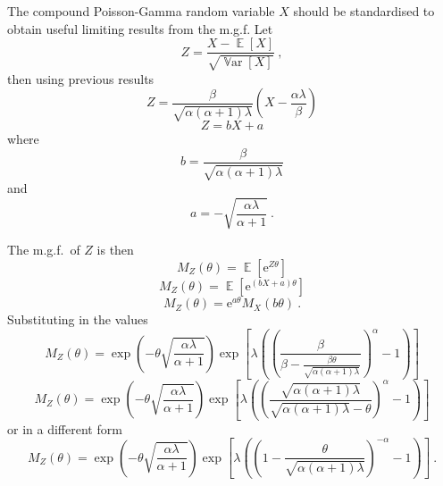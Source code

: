 \documentclass[12pt, a4paper]{memoir}
\DeclareMathOperator{\expectation}{\mathbb{E}}
\DeclareMathOperator{\variance}{\mathbb{V}ar}
\newcommand{\euler}{\mathrm{e}}
\begin{document}
The compound Poisson-Gamma random variable $X$ should be standardised to obtain useful limiting results from the m.g.f. Let
\begin{equation}
Z = \frac{X-\expectation[X]}{\sqrt{\variance[X]}} \ ,
\end{equation}
then using previous results
\begin{equation*}
Z = \frac{\beta}{\sqrt{\alpha(\alpha+1)\lambda}}\left(
X-\frac{\alpha\lambda}{\beta}
\right)
\end{equation*}
\begin{equation}
Z = bX+a
\end{equation}
where
\begin{equation}
b = \frac{\beta}{\sqrt{\alpha(\alpha+1)\lambda}}
\end{equation}
and
\begin{equation}
a = -\sqrt{\frac{\alpha\lambda}{\alpha+1}} \ .
\end{equation}

The m.g.f.~of $Z$ is then
\begin{equation*}
M_Z(\theta)=\expectation\left[\euler^{Z\theta}\right]
\end{equation*}
\begin{equation*}
M_Z(\theta)=\expectation\left[\euler^{(bX+a)\theta}\right]
\end{equation*}
\begin{equation*}
M_Z(\theta)=\euler^{a\theta}M_X(b\theta) \ .
\end{equation*}
Substituting in the values
\begin{equation*}
M_Z(\theta)=\exp\left(-\theta\sqrt{\frac{\alpha\lambda}{\alpha+1}}\right)
\exp\left[
\lambda\left(
\left(
\frac{\beta}{\beta-\frac{\beta\theta}{\sqrt{\alpha(\alpha+1)\lambda}}}
\right)^\alpha-1
\right)
\right]
\end{equation*}
\begin{equation*}
M_Z(\theta)=\exp\left(-\theta\sqrt{\frac{\alpha\lambda}{\alpha+1}}\right)
\exp\left[
\lambda\left(
\left(
\frac{\sqrt{\alpha(\alpha+1)\lambda}}{\sqrt{\alpha(\alpha+1)\lambda}-\theta}
\right)^\alpha
-1\right)
\right]
\end{equation*}
or in a different form
\begin{equation}
M_Z(\theta)=\exp\left(-\theta\sqrt{\frac{\alpha\lambda}{\alpha+1}}\right)
\exp\left[
\lambda\left(
\left(
1-\frac{\theta}{\sqrt{\alpha(\alpha+1)\lambda}}
\right)^{-\alpha}
-1\right)
\right] \ .
\end{equation}
\end{document}
